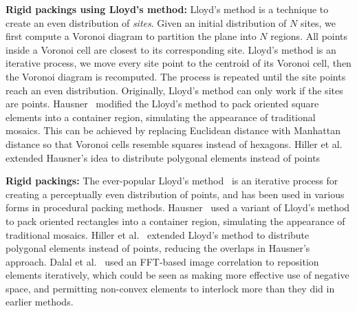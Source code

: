 \textbf{Rigid packings using Lloyd's method:}
Lloyd's method is a technique to create an even distribution of \textit{sites}.
Given an initial distribution of $N$ sites, we first compute a Voronoi diagram to partition the plane into $N$ regions.
All points inside a Voronoi cell are closest to its corresponding site.
Lloyd's method is an iterative process, we move every site point to the centroid of its Voronoi cell, then the Voronoi diagram is recomputed.
The process is repeated until the site points reach an even distribution.
Originally, Lloyd's method can only work if the sites are points.
Hausner~\cite{Hausner2001} modified the Lloyd's method to pack oriented square elements into a container 
region, simulating the appearance of traditional mosaics. 
This can be achieved by replacing Euclidean distance with Manhattan distance so that Voronoi cells resemble squares instead of hexagons.
Hiller et al.~\cite{Hiller2003} extended Hausner's idea to distribute polygonal
elements instead of points 



\textbf{Rigid packings:}
The ever-popular Lloyd's method~\cite{McCool1992}
is an iterative
process for creating a perceptually even distribution of points, and has been
used in various forms in procedural packing methods.
Hausner~\cite{Hausner2001} 
used a variant of Lloyd's method to pack oriented rectangles into a container 
region, simulating the appearance of traditional mosaics.  
Hiller et al.~\cite{Hiller2003} extended Lloyd's method to distribute polygonal
elements instead of points, reducing the overlaps in Hausner's approach.
Dalal et al.~\cite{Dalal2006} used an FFT-based image correlation to reposition
elements iteratively, which could be seen as making more effective use of negative
space, and permitting non-convex elements to interlock more than they did in
earlier methods.


